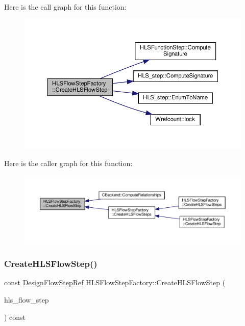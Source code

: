 Here is the call graph for this function\+:
\nopagebreak
\begin{figure}[H]
\begin{center}
\leavevmode
\includegraphics[width=350pt]{dd/d39/classHLSFlowStepFactory_ae5460c506f214e7b874e267e18ca8531_cgraph}
\end{center}
\end{figure}
Here is the caller graph for this function\+:
\nopagebreak
\begin{figure}[H]
\begin{center}
\leavevmode
\includegraphics[width=350pt]{dd/d39/classHLSFlowStepFactory_ae5460c506f214e7b874e267e18ca8531_icgraph}
\end{center}
\end{figure}
\mbox{\label{classHLSFlowStepFactory_a6f112350282f875b5ffef9050bd16dde}} 
\subsubsection{\texorpdfstring{Create\+H\+L\+S\+Flow\+Step()}{CreateHLSFlowStep()}\hspace{0.1cm}{\footnotesize\ttfamily [2/3]}}
{\footnotesize\ttfamily const \hyperlink{design__flow__step_8hpp_a9dd6b4474ddf52d41a78b1aaa12ae6c8}{Design\+Flow\+Step\+Ref} H\+L\+S\+Flow\+Step\+Factory\+::\+Create\+H\+L\+S\+Flow\+Step (\begin{DoxyParamCaption}\item[{const std\+::pair$<$ \hyperlink{hls__step_8hpp_ada16bc22905016180e26fc7e39537f8d}{H\+L\+S\+Flow\+Step\+\_\+\+Type}, \hyperlink{hls__step_8hpp_a5fdd2edf290c196531d21d68e13f0e74}{H\+L\+S\+Flow\+Step\+Specialization\+Const\+Ref} $>$ \&}]{hls\+\_\+flow\+\_\+step }\end{DoxyParamCaption}) const}



